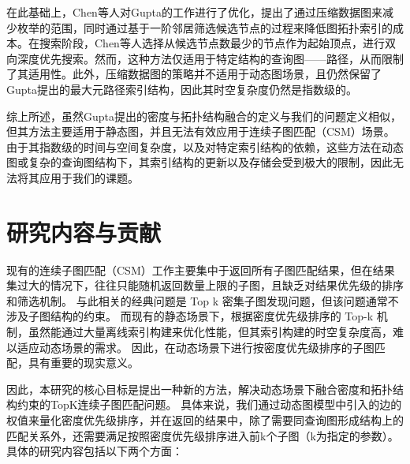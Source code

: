 
在此基础上，Chen\cite{static-topk-Chen-DBLP:journals/ijprai/ChenLCTL18}等人对Gupta的工作进行了优化，提出了通过压缩数据图来减少枚举的范围，同时通过基于一阶邻居筛选候选节点的过程来降低图拓扑索引的成本。在搜索阶段，Chen\cite{static-topk-Chen-DBLP:journals/ijprai/ChenLCTL18}等人选择从候选节点数最少的节点作为起始顶点，进行双向深度优先搜索。然而，这种方法仅适用于特定结构的查询图——路径，从而限制了其适用性。此外，压缩数据图的策略并不适用于动态图场景，且仍然保留了Gupta提出的最大元路径索引结构，因此其时空复杂度仍然是指数级的。

综上所述，虽然Gupta提出的密度与拓扑结构融合的定义与我们的问题定义相似，但其方法主要适用于静态图，并且无法有效应用于连续子图匹配（CSM）场景。由于其指数级的时间与空间复杂度，以及对特定索引结构的依赖，这些方法在动态图或复杂的查询图结构下，其索引结构的更新以及存储会受到极大的限制，因此无法将其应用于我们的课题。
\section{研究内容与贡献}
现有的连续子图匹配（CSM）工作主要集中于返回所有子图匹配结果，但在结果集过大的情况下，往往只能随机返回数量上限的子图，且缺乏对结果优先级的排序和筛选机制。
与此相关的经典问题是 Top k 密集子图发现问题，但该问题通常不涉及子图结构的约束。
而现有的静态场景下，根据密度优先级排序的 Top-k 机制，虽然能通过大量离线索引构建来优化性能，但其索引构建的时空复杂度高，难以适应动态场景的需求。
因此，在动态场景下进行按密度优先级排序的子图匹配，具有重要的现实意义。

因此，本研究的核心目标是提出一种新的方法，解决动态场景下融合密度和拓扑结构约束的TopK连续子图匹配问题。
具体来说，我们通过动态图模型中引入的边的权值来量化密度优先级排序，并在返回的结果中，除了需要同查询图形成结构上的匹配关系外，还需要满足按照密度优先级排序进入前k个子图（k为指定的参数）。具体的研究内容包括以下两个方面：

